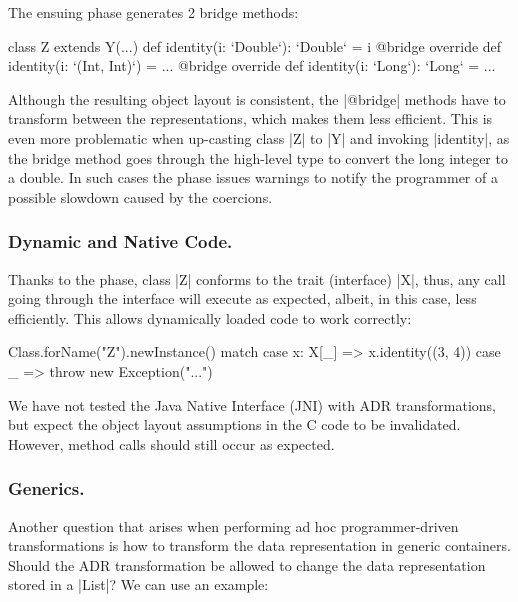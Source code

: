 The ensuing \bridge{} phase generates 2 bridge methods: %

\begin{lstlisting-nobreak}
class Z extends Y(...) {
  def identity(i: `Double`): `Double` = i
  @bridge override def identity(i: `(Int, Int)`) = ...
  @bridge override def identity(i: `Long`): `Long` = ...
}
\end{lstlisting-nobreak}


Although the resulting object layout is consistent, the |@bridge| methods have to transform between the representations, which makes them less efficient. This is even more problematic when up-casting class |Z| to |Y| and invoking |identity|, as the bridge method goes through the high-level type to convert the long integer to a double. In such cases the \bridge{} phase issues warnings to notify the programmer of a possible slowdown caused by the coercions.

\subsubsection{Dynamic and Native Code.} Thanks to the \bridge{} phase, class |Z| conforms to the trait (interface) |X|, thus, any call going through the interface will execute as expected, albeit, in this case, less efficiently. This allows dynamically loaded code to work correctly:

\label{sec:ildl:language-dynamically-loaded-code}

\begin{lstlisting-nobreak}
Class.forName("Z").newInstance() match {
  case x: X[_] => x.identity((3, 4))
  case _ => throw new Exception("...")
}
\end{lstlisting-nobreak}

We have not tested the Java Native Interface (JNI) with ADR transformations, but expect the object layout assumptions in the C code to be invalidated. However, method calls should still occur as expected.

\subsubsection{Generics.}
\label{sec:ildl:language-generics}
Another question that arises when performing ad hoc programmer-driven transformations is how to transform the data representation in generic containers. Should the ADR transformation be allowed to change the data representation stored in a |List|? We can use an example:

